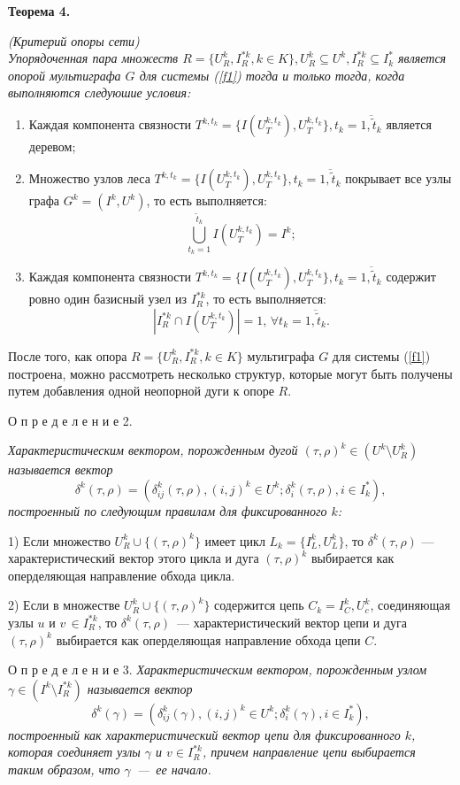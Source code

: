 \documentclass[14pt]{extarticle}%
\begin{document}
\textbf{Теорема 4.} {\it(Критерий опоры сети)\\
Упорядоченная пара множеств $R=\{U^k_R, I^{*k}_R, k\in K\},U^k_R\subseteq U^k, I^{*k}_R\subseteq I^*_k$ является опорой мультиграфа $G$ для системы (\ref{f1}) тогда и только тогда, когда выполняются следуюшие условия:
\begin{enumerate}
\item Каждая компонента связности $T^{k,t_k}=\{I(U^{k,t_k}_T), U^{k,t_k}_T\}, t_k=\overline{1,\widetilde t_k}$ является деревом;

\item Множество узлов леса $T^{k,t_k}=\{I(U^{k,t_k}_T), U^{k,t_k}_T\}, t_k=\overline{1,\widetilde t_k}$ покрывает все узлы графа $G^k=(I^k, U^k)$, то есть выполняется:
$$\bigcup_{t_k=1}^{\widetilde t_k} I\left(U^{k,t_k}_T\right)=I^k;$$


\item Каждая компонента связности $T^{k,t_k}=\{I(U^{k,t_k}_T), U^{k,t_k}_T\}, t_k=\overline{1,\widetilde t_k}$ содержит ровно один базисный узел из $I^{*k}_R$, то есть выполняется:
$$|I^{*k}_R\cap I\left(U^{k,t_k}_T\right)|=1,\, \forall t_k=\overline{1,\widetilde t_k}.$$
\end{enumerate}}

После того, как опора $R=\{U^k_R, I^{*k}_R, k\in K\}$ мультиграфа $G$ для системы (\ref{f1}) построена, можно рассмотреть несколько структур, которые могут быть получены путем добавления одной неопорной дуги к опоре $R$.

О п р е д е л е н и е 2. {\it Характеристическим вектором, порожденным дугой $(\tau, \rho)^k\in \left(U^k\setminus U^k_R\right)$ называется вектор 
$$\delta^k(\tau,\rho)=(\delta^k_{ij}(\tau, \rho), (i,j)^k\in U^k; \delta^k_i(\tau, \rho), i\in I^*_k),$$ 
построенный по следующим правилам для фиксированного $k$:

1)  Если множество $U^k_R\cup\{(\tau, \rho)^k\}$ имеет цикл $L_k=\{I^k_L, U^k_L\}$, то $\delta^k(\tau, \rho)$ --- характеристический вектор этого цикла и дуга $(\tau, \rho)^k$ выбирается как оперделяющая направление обхода цикла.

2)  Если в множестве $U^k_R\cup\{(\tau, \rho)^k\}$ содержится цепь $C_k={I^k_C, U^k_c}$, соединяющая узлы $u$ и $v\, \in I^{*k}_R$, то $\delta^k(\tau, \rho)$~--- характеристический вектор цепи и дуга $(\tau, \rho)^k$ выбирается как оперделяющая направление обхода цепи $C$.}

О п р е д е л е н и е 3.  \textit{Характеристическим вектором, порожденным узлом $\gamma\in (I^k\setminus I^{*k}_R)$ называется вектор 
$$\delta^k(\gamma)=(\delta^k_{ij}(\gamma), (i,j)^k\in U^k; \delta^k_i(\gamma), i\in I^*_k),$$
 построенный как характеристический вектор цепи для фиксированного $k$, которая соединяет узлы $\gamma$ и $v\in I^{*k}_R$, причем направление цепи выбирается таким образом, что $\gamma$~---~ее начало.}
\end{document}
